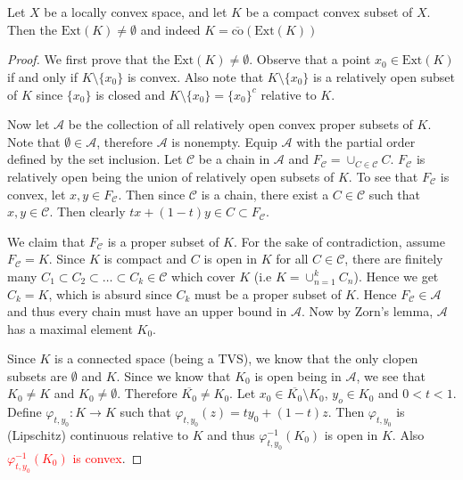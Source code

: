 
\chapter{}

\begin{theorem}
  Let $X$ be a locally convex space, and let $K$ be a compact convex subset of $X$. Then the $ \textrm{Ext}(K) \neq \emptyset$ and indeed $K = \overline{\textrm{co}}(\textrm{Ext}(K))$
\end{theorem}
\begin{proof}
  We first prove that the $\textrm{Ext}(K) \neq \emptyset$. Observe that a point $x_0 \in \textrm{Ext}(K)$ if and only if $ K \setminus \{ x_0 \}$ is convex. Also note that $K \setminus \{ x_0 \}$ is a relatively open subset of $K$ since $\{ x_0 \}$ is closed and $K \setminus \{ x_0 \} = \{ x_0 \}^c$ relative to $K$.

  Now let $ \mathcal{A}$ be the collection of all relatively open convex proper subsets of $K$. Note that $\emptyset \in \mathcal{A}$, therefore $\mathcal{A}$ is nonempty. Equip $\mathcal{A}$ with the partial order defined by the set inclusion. Let $\mathscr{C}$ be a chain in $\mathcal{A}$ and $F_{\mathscr{C}} = \cup_{C \in \mathscr{C}} C$. $F_{ \mathscr{C}}$ is relatively open being the union of relatively open subsets of $K$. To see that $F_{\mathscr{C}}$ is convex, let $x,  y \in F_{\mathscr{C}}$. Then since $\mathscr{C}$ is a chain, there exist a $C \in \mathscr{C}$ such that $x, y \in \mathscr{C}$. Then clearly $tx + (1-t)y \in C \subset F_{\mathscr{C}}$.

  We claim that $F_{ \mathscr{C}}$ is a proper subset of $K$. For the sake of contradiction, assume $F_{ \mathscr{C}} = K$. Since $K$ is compact and $C$ is open in $K$ for all $C \in \mathscr{C}$, there are finitely many $C_1 \subset C_2 \subset \ldots \subset C_k \in  \mathscr{C}$ which cover $K$ (i.e $K = \cup_{n = 1}^{k}C_n$). Hence we get $C_k = K$, which is absurd since $C_k$ must be a proper subset of $K$.
  Hence $F_{\mathscr{C}} \in \mathcal{A}$ and thus every chain must have an upper bound in $\mathcal{A}$. Now by Zorn's lemma, $\mathcal{A}$ has a maximal element $K_0$.

  Since $K$ is a connected space (being a TVS), we know that the only clopen subsets are $\emptyset$ and $K$. Since we know that $K_0$ is open being in $\mathcal{A}$, we see that $K_0 \neq K$ and $K_0 \neq \emptyset$. Therefore $ \overline{K_0} \neq K_0$. Let $ x_0 \in \overline{K_0} \setminus K_0$, $y_o \in K_0$ and $0 < t <1$. Define $\varphi_{t, y_0}: K \to K$ such that $\varphi_{t, y_0}(z) = ty_0 + (1-t) z$. Then $\varphi_{t, y_0}$ is (Lipschitz) continuous relative to $K$ and thus $\varphi_{t, y_0}^{-1}(K_0)$ is open in $K$. Also \textcolor{red}{$\varphi_{t, y_0}^{-1}(K_0)$ is convex}.


\end{proof}
